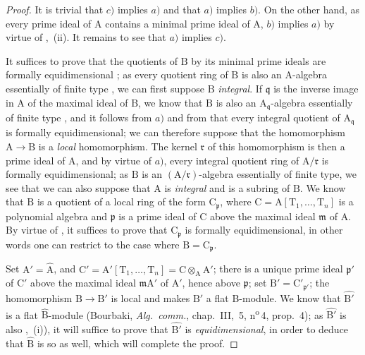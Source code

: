 \begin{proof}
It is trivial that $c)$ implies $a)$ and that $a)$ implies $b)$.
On the other hand, as every prime ideal of $\mathrm{A}$ contains a minimal prime ideal of $\mathrm{A}$, $b)$ implies $a)$ by virtue of ,~(ii).
It remains to see that $a)$ implies $c)$.

It suffices to prove that the quotients of $\mathrm{B}$ by its minimal prime ideals are formally equidimensional ; as every quotient ring of $\mathrm{B}$ is also an A-algebra essentially of finite type , we can first suppose $\mathrm{B}$ \emph{integral}.
If $\mathfrak{q}$ is the inverse image in $\mathrm{A}$ of the maximal ideal of $\mathrm{B}$, we know that $\mathrm{B}$ is also an $\mathrm{A}_\mathfrak{q}$-algebra essentially of finite type , and it follows from $a)$ and from  that every integral quotient of $\mathrm{A}_\mathfrak{q}$ is formally equidimensional; we can therefore suppose that the homomorphism $\mathrm{A}\to\mathrm{B}$ is a \emph{local} homomorphism.
The kernel $\mathfrak{r}$ of this homomorphism is then a prime ideal of $\mathrm{A}$, and by virtue of $a)$, every integral quotient ring of $\mathrm{A}/\mathfrak{r}$ is formally equidimensional; as $\mathrm{B}$ is an $(\mathrm{A}/\mathfrak{r})$-algebra essentially of finite type, we see that we can also suppose
that $\mathrm{A}$ is \emph{integral} and is a subring of $\mathrm{B}$.
We know  that $\mathrm{B}$ is a quotient of a local ring of the form $\mathrm{C}_\mathfrak{p}$, where $\mathrm{C}=\mathrm{A}[\mathrm{T}_1,\ldots,\mathrm{T}_n]$ is a polynomial algebra and $\mathfrak{p}$ is a prime ideal of $\mathrm{C}$ above the maximal ideal $\mathfrak{m}$ of $\mathrm{A}$.
By virtue of , it suffices to prove that $\mathrm{C}_\mathfrak{p}$ is formally equidimensional, in other words one can restrict to the case where $\mathrm{B}=\mathrm{C}_\mathfrak{p}$.

Set $\mathrm{A}'=\widehat{\mathrm{A}}$, and $\mathrm{C}'=\mathrm{A}'[\mathrm{T}_1,\ldots,\mathrm{T}_n]=\mathrm{C}\otimes_\mathrm{A}\mathrm{A}'$; there is a unique prime ideal $\mathfrak{p}'$ of $\mathrm{C}'$ above the maximal ideal $\mathfrak{m}\mathrm{A}'$ of $\mathrm{A}'$, hence above $\mathfrak{p}$; set $\mathrm{B}'=\mathrm{C}'_{\mathfrak{p}'}$; the homomorphism $\mathrm{B}\to\mathrm{B}'$ is local and makes $\mathrm{B}'$ a flat B-module.
We know that $\widehat{\mathrm{B}'}$ is a flat $\widehat{\mathrm{B}}$-module (Bourbaki, \emph{Alg.\ comm.}, chap.~III, \textsection\,5, n\textsuperscript{o}\,4, prop.~4); as $\widehat{\mathrm{B}'}$ is also ,~(i)), it will suffice to prove that $\widehat{\mathrm{B}'}$ is \emph{equidimensional}, in order to deduce that $\widehat{\mathrm{B}}$ is so as well, which will complete the proof.


\end{proof}
